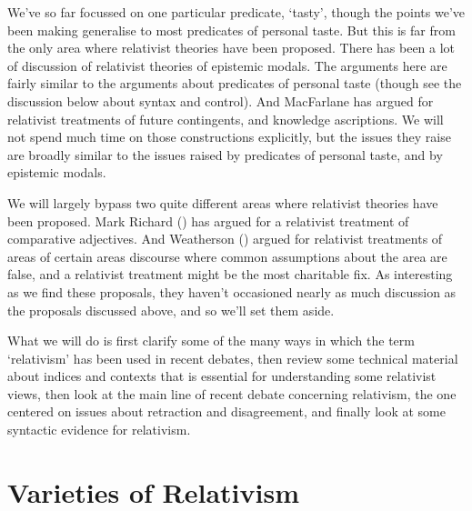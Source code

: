 \documentclass[
  10pt,
  letterpaper,
  DIV=11,
  numbers=noendperiod,
  twoside]{scrartcl}
\begin{document}
We've so far focussed on one particular predicate, `tasty', though the
points we've been making generalise to most predicates of personal
taste. But this is far from the only area where relativist theories have
been proposed. There has been a lot of discussion of relativist theories
of epistemic modals. The arguments here are fairly similar to the
arguments about predicates of personal taste (though see the discussion
below about syntax and control). And MacFarlane has argued for
relativist treatments of future contingents, and knowledge ascriptions.
We will not spend much time on those constructions explicitly, but the
issues they raise are broadly similar to the issues raised by predicates
of personal taste, and by epistemic modals.

We will largely bypass two quite different areas where relativist
theories have been proposed. Mark Richard
() has argued for a relativist treatment
of comparative adjectives. And Weatherson
() argued for relativist
treatments of areas of certain areas discourse where common assumptions
about the area are false, and a relativist treatment might be the most
charitable fix. As interesting as we find these proposals, they haven't
occasioned nearly as much discussion as the proposals discussed above,
and so we'll set them aside.

What we will do is first clarify some of the many ways in which the term
`relativism' has been used in recent debates, then review some technical
material about indices and contexts that is essential for understanding
some relativist views, then look at the main line of recent debate
concerning relativism, the one centered on issues about retraction and
disagreement, and finally look at some syntactic evidence for
relativism.

\section{Varieties of Relativism}\label{varietiesofrelativism}
\end{document}
